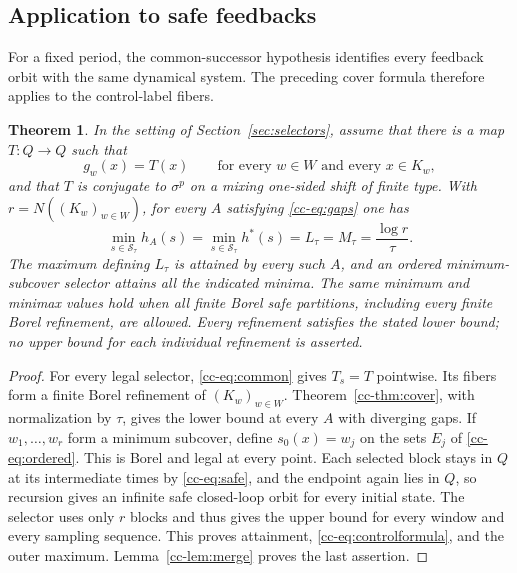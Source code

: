 \documentclass[11pt,reqno]{amsart}
\numberwithin{equation}{section}
\newtheorem{theorem}{Theorem}[section]
\theoremstyle{definition}
\newcommand{\hpat}{h^{*}}
\newcommand{\Ssafe}{\mathcal S}
\begin{document}
\subsection{Application to safe feedbacks}\label{sec:common-successor}

For a fixed period, the common-successor hypothesis identifies every
feedback orbit with the same dynamical system. The preceding cover
formula therefore applies to the control-label fibers.

\begin{theorem}\label{cc-thm:control}
In the setting of Section~\ref{sec:selectors}, assume that there is
a map $T:Q\to Q$ such that
\begin{equation}\label{cc-eq:common}
 g_w(x)=T(x)\qquad\text{for every }w\in W\text{ and every }x\in K_w,
\end{equation}
and that $T$ is conjugate to $\sigma^p$ on a mixing one-sided shift of
finite type. With $r=N((K_w)_{w\in W})$, for every $A$ satisfying
\eqref{cc-eq:gaps} one has
\begin{equation}\label{cc-eq:controlformula}
 \min_{s\in\Ssafe_\tau}h_A(s)
 =\min_{s\in\Ssafe_\tau}\hpat(s)
 =L_\tau=M_\tau=\frac{\log r}{\tau}.
\end{equation}
The maximum defining $L_\tau$ is attained by every such $A$, and an
ordered minimum-subcover selector attains all the indicated minima.
The same minimum and minimax values hold when all finite Borel safe
partitions, including every finite Borel refinement, are allowed. Every
refinement satisfies the stated lower bound; no upper bound for each
individual refinement is asserted.
\end{theorem}
\begin{proof}
For every legal selector, \eqref{cc-eq:common} gives $T_s=T$ pointwise.
Its fibers form a finite Borel refinement of $(K_w)_{w\in W}$.
Theorem~\ref{cc-thm:cover}, with normalization by $\tau$, gives the lower
bound at every $A$ with diverging gaps. If $w_1,\ldots,w_r$ form a
minimum subcover, define $s_0(x)=w_j$ on the sets $E_j$ of
\eqref{cc-eq:ordered}. This is Borel and legal at every point. Each selected
block stays in $Q$ at its intermediate times by \eqref{cc-eq:safe}, and
the endpoint again lies in $Q$, so recursion gives an infinite safe
closed-loop orbit for every initial state. The selector uses only $r$
blocks and thus gives the upper bound for every window and every
sampling sequence. This proves attainment, \eqref{cc-eq:controlformula},
and the outer maximum. Lemma~\ref{cc-lem:merge} proves the last assertion.
\end{proof}
\end{document}
